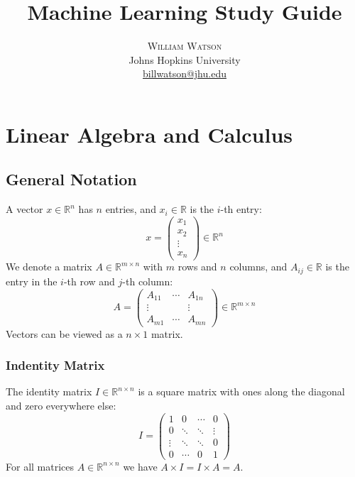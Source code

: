 \documentclass[twoside,twocolumn]{article}
\title{Machine Learning Study Guide}
\author{%
  \textsc{William Watson} \\[1ex]
  \normalsize Johns Hopkins University \\
  \normalsize \href{mailto:billwatson@jhu.edu}{billwatson@jhu.edu}
}
\date{}%
\begin{document}
\maketitle

\tableofcontents
\onecolumn
\section{Linear Algebra and Calculus}
\subsection{General Notation}
A vector $x \in \mathbb{R}^n$ has $n$ entries, and $x_i \in \mathbb{R}$ is the
$i$-th entry:
\begin{equation}
  x=\left(\begin{array}{c}x_1\\x_2\\\vdots\\x_n\end{array}\right)\in\mathbb{R}^n
\end{equation}
We denote a matrix $A \in \mathbb{R}^{m \times n}$ with $m$ rows and $n$
columns, and $A_{ij} \in \mathbb{R}$ is the entry in the $i$-th row and
$j$-th column:
\begin{equation}
  A=\left(\begin{array}{ccc}A_{11}& \cdots&A_{1n}\\\vdots&& \vdots\\A_{m1}& \cdots&A_{mn}\end{array}\right)\in\mathbb{R}^{m\times n}
\end{equation}
Vectors can be viewed as a $n \times 1$ matrix.
\subsubsection{Indentity Matrix}
The identity matrix $I\in\mathbb{R}^{n\times n}$ is a square matrix with ones
along the diagonal and zero everywhere else:
\begin{equation}
  I=\left(\begin{array}{cccc}1&0& \cdots&0\\0& \ddots& \ddots& \vdots\\\vdots& \ddots& \ddots&0\\0& \cdots&0&1\end{array}\right)
\end{equation}
For all matrices $A \in \mathbb{R}^{n \times n}$ we have
$A \times I = I \times A = A$.
\end{document}

